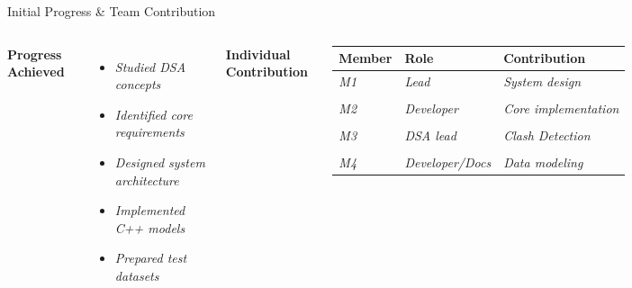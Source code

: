 \documentclass[aspectratio=169,11pt]{beamer}
\newcommand{\placeholder}[1]{\textit{\color{GEUGrey}#1}}
\begin{document}
\begin{frame}{Initial Progress \& Team Contribution}
\begin{columns}[T,totalwidth=\textwidth]
\textbf{\color{GEUBlue}Progress Achieved}
\begin{itemize}\itemsep3pt
\item \placeholder{Studied DSA concepts}
\item \placeholder{Identified core requirements}
\item \placeholder{Designed system architecture}
\item \placeholder{Implemented C++ models}
\item \placeholder{Prepared test datasets}
\end{itemize}
\textbf{\color{GEUBlue}Individual Contribution}
\vspace{2mm}
\scriptsize
\begin{tabularx}{\textwidth}{@{}p{1.8cm}p{2.0cm}X@{}}
\toprule
Member & Role & Contribution\\
\midrule
\placeholder{M1} & \placeholder{Lead} & \placeholder{System design}\\\\
\placeholder{M2} & \placeholder{Developer} & \placeholder{Core implementation}\\\\
\placeholder{M3} & \placeholder{DSA lead} & \placeholder{Clash Detection}\\\\
\placeholder{M4} & \placeholder{Developer/Docs} & \placeholder{Data modeling}\\
\bottomrule
\end{tabularx}
\end{columns}
\end{frame}
\end{document}
